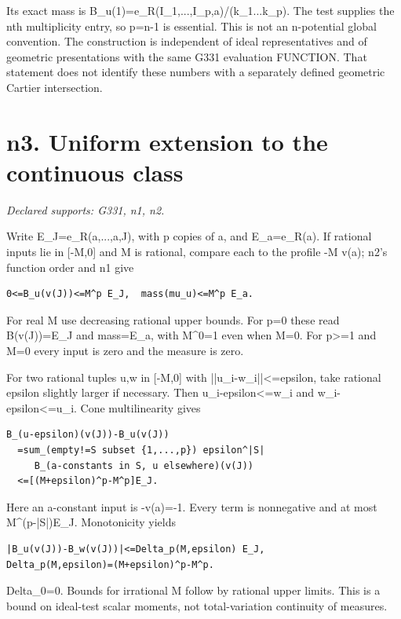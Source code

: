 \documentclass[11pt]{article}
\begin{document}
Its exact mass is B\_u(1)=e\_R(I\_1,...,I\_p,a)/(k\_1...k\_p). The test supplies the nth multiplicity entry, so p=n-1 is essential. This is not an n-potential global convention. The construction is independent of ideal representatives and of geometric presentations with the same G331 evaluation FUNCTION. That statement does not identify these numbers with a separately defined geometric Cartier intersection.

\section{n3. Uniform extension to the continuous class}
\textit{Declared supports: G331, n1, n2.}

Write E\_J=e\_R(a,...,a,J), with p copies of a, and E\_a=e\_R(a). If rational inputs lie in [-M,0] and M is rational, compare each to the profile -M v(a); n2's function order and n1 give

\begin{Verbatim}[fontsize=\small,breaklines=true,breakanywhere=true]
0<=B_u(v(J))<=M^p E_J,  mass(mu_u)<=M^p E_a.
\end{Verbatim}

For real M use decreasing rational upper bounds. For p=0 these read B(v(J))=E\_J and mass=E\_a, with M\textasciicircum{}0=1 even when M=0. For p>=1 and M=0 every input is zero and the measure is zero.

For two rational tuples u,w in [-M,0] with ||u\_i-w\_i||<=epsilon, take rational epsilon slightly larger if necessary. Then u\_i-epsilon<=w\_i and w\_i-epsilon<=u\_i. Cone multilinearity gives

\begin{Verbatim}[fontsize=\small,breaklines=true,breakanywhere=true]
B_(u-epsilon)(v(J))-B_u(v(J))
  =sum_(empty!=S subset {1,...,p}) epsilon^|S|
     B_(a-constants in S, u elsewhere)(v(J))
  <=[(M+epsilon)^p-M^p]E_J.
\end{Verbatim}

Here an a-constant input is -v(a)=-1. Every term is nonnegative and at most M\textasciicircum{}(p-|S|)E\_J. Monotonicity yields

\begin{Verbatim}[fontsize=\small,breaklines=true,breakanywhere=true]
|B_u(v(J))-B_w(v(J))|<=Delta_p(M,epsilon) E_J,
Delta_p(M,epsilon)=(M+epsilon)^p-M^p.
\end{Verbatim}

Delta\_0=0. Bounds for irrational M follow by rational upper limits. This is a bound on ideal-test scalar moments, not total-variation continuity of measures.
\end{document}
